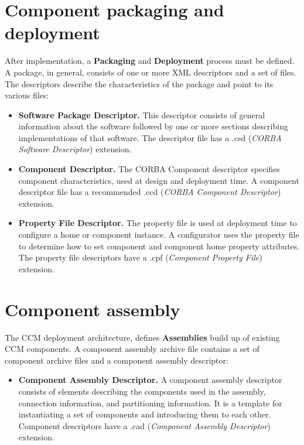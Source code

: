 \section{Component packaging and deployment}
After implementation, a {\bf Packaging} and {\bf Deployment} process must be 
defined. A package, in general, consists of one or more XML descriptors and 
a set of files. 
The descriptors describe the characteristics of the package and point to its 
various files:
\begin{itemize} 
\item {\bf Software Package Descriptor.}
This descriptor consists of general information about the software followed by 
one or more sections describing implementations of that software.
The descriptor file has a  .csd ({\it CORBA Software Descriptor}) extension.

\item {\bf Component Descriptor.}
The CORBA Component descriptor specifies component characteristics, used at 
design and deployment time. A component descriptor file has a recommended  .ccd 
({\it CORBA Component Descriptor}) extension.

\item {\bf Property File Descriptor.}
The property file is used at deployment time to configure a home or component 
instance. 
A configurator uses the property file to determine how to set component and 
component home property attributes.
The property file descriptors have a .cpf ({\it Component Property File}) 
extension.
\end{itemize}


\section{Component assembly}
The CCM deployment architecture, defines {\bf Assemblies} build up of 
existing CCM components.
A component assembly archive file contains a set of component archive files
and a component assembly descriptor: 

\begin{itemize} 
\item {\bf Component Assembly Descriptor.}
A component assembly descriptor consists of elements describing the components 
used in the assembly, connection information, and partitioning information.
It is a template for instantiating a set of components and introducing them 
to each other.
Component descriptors have a .cad  ({\it Component Assembly Descriptor}) 
extension.
\end{itemize}

